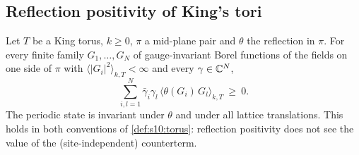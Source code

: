 \subsection{Reflection positivity of King's tori}

\begin{proposition}\label{prop:s10:RP}
Let $T$ be a King torus, $k\ge0$, $\pi$ a mid-plane pair and $\theta$ the reflection in $\pi$. For every finite family $G_1,\dots,G_N$ of gauge-invariant Borel functions of the fields on one side of $\pi$ with $\langle|G_i|^2\rangle_{k,T}<\infty$ and every $\gamma\in\mathbb C^N$,
\[
\sum_{i,l=1}^N\bar\gamma_i\gamma_l\,\langle\theta(G_i)\,G_l\rangle_{k,T}\ \ge\ 0 .
\]
The periodic state is invariant under $\theta$ and under all lattice translations. This holds in both conventions of \cref{def:s10:torus}: reflection positivity does not see the value of the (site-independent) counterterm.
\end{proposition}

